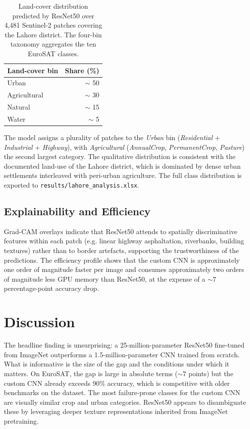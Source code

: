 \documentclass[conference]{IEEEtran}
\begin{document}
\begin{table}[t]
\caption{Land-cover distribution predicted by ResNet50 over
4{,}481 Sentinel-2 patches covering the Lahore district. The
four-bin taxonomy aggregates the ten EuroSAT classes.}
\label{tab:lahore}
\centering
\begin{tabular}{lr}
\toprule
Land-cover bin & Share (\%) \\
\midrule
Urban         & $\sim$ 50 \\
Agricultural  & $\sim$ 30 \\
Natural       & $\sim$ 15 \\
Water         & $\sim$ 5 \\
\bottomrule
\end{tabular}
\end{table}

The model assigns a plurality of patches to the \emph{Urban} bin
(\emph{Residential} + \emph{Industrial} + \emph{Highway}), with
\emph{Agricultural} (\emph{AnnualCrop}, \emph{PermanentCrop},
\emph{Pasture}) the second largest category. The qualitative
distribution is consistent with the documented land-use of the
Lahore district, which is dominated by dense urban settlements
interleaved with peri-urban agriculture. The full class
distribution is exported to \texttt{results/lahore\_analysis.xlsx}.

\subsection{Explainability and Efficiency}

Grad-CAM overlays indicate that ResNet50 attends to spatially
discriminative features within each patch (e.g. linear highway
asphaltation, riverbanks, building textures) rather than to
border artefacts, supporting the trustworthiness of the predictions.
The efficiency profile shows that the custom CNN is approximately
one order of magnitude faster per image and consumes approximately
two orders of magnitude less GPU memory than ResNet50, at the
expense of a $\sim 7$ percentage-point accuracy drop.

\section{Discussion}
\label{sec:discussion}

The headline finding is unsurprising: a 25-million-parameter
ResNet50 fine-tuned from ImageNet outperforms a 1.5-million-parameter
CNN trained from scratch. What is informative is the size of the
gap and the conditions under which it matters. On EuroSAT, the gap
is large in absolute terms ($\sim 7$ points) but the custom CNN
already exceeds 90\% accuracy, which is competitive with older
benchmarks on the dataset. The most failure-prone classes for the
custom CNN are visually similar crop and urban categories. ResNet50
appears to disambiguate these by leveraging deeper texture
representations inherited from ImageNet pretraining.
\end{document}
